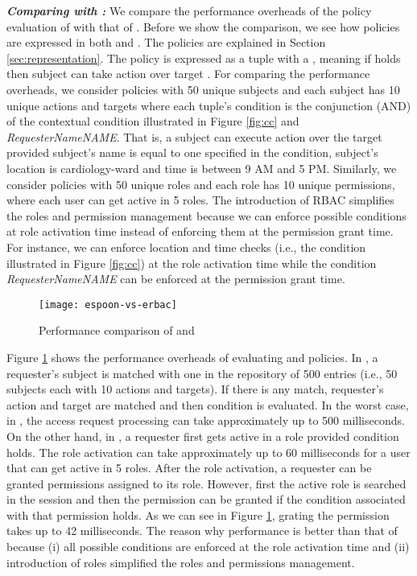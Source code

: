 \documentclass[final,5p,times,twocolumn]{elsarticle}
\begin{document}
\emph{\textbf{Comparing  with :}}
We compare the performance overheads of the policy evaluation of  with that of  \cite{Asghar2011ARES}. Before we show the comparison, we see how policies are expressed in both  and . The  policies are explained in Section \ref{sec:representation}. The  policy is expressed as a  tuple with a , meaning if  holds then subject  can take action  over target . For comparing the performance overheads, we consider  policies with 50 unique subjects and each subject has 10 unique actions and targets where each  tuple's condition is the conjunction (AND) of the contextual condition illustrated in Figure \ref{fig:cc} and \emph{RequesterNameNAME}. That is, a subject can execute action over the target provided subject's name is equal to one specified in the condition, subject's location is cardiology-ward and time is between 9 AM and 5 PM. Similarly, we consider  policies with 50 unique roles and each role has 10 unique permissions, where each user can get active in 5 roles. The introduction of RBAC simplifies the roles and permission management because we can enforce possible conditions at role activation time instead of enforcing them at the permission grant time. For instance, we can enforce location and time checks (i.e., the condition illustrated in Figure \ref{fig:cc}) at the role activation time while the condition \emph{RequesterNameNAME} can be enforced at the permission grant time. 

\begin{figure}
\centering
\texttt{[image: espoon-vs-erbac]} \caption{Performance comparison of  and }
\label{fig:espoon-vs-erbac}
\end{figure}

Figure \ref{fig:espoon-vs-erbac} shows the performance overheads of evaluating  and  policies. In , a requester's subject is matched with one in the repository of 500 entries (i.e., 50 subjects each with 10 actions and targets). If there is any match, requester's action and target are matched and then condition is evaluated. In the worst case, in , the access request processing can take approximately up to 500 milliseconds. On the other hand, in , a requester first gets active in a role provided condition holds. The role activation can take approximately up to 60 milliseconds for a user that can get active in 5 roles. After the role activation, a requester can be granted permissions assigned to its role. However, first the active role is searched in the session and then the permission can be granted if the condition associated with that permission holds. As we can see in Figure \ref{fig:espoon-vs-erbac}, grating the permission takes up to 42 milliseconds. The reason why  performance is better than that of  because (i) all possible conditions are enforced at the role activation time and (ii) introduction of roles simplified the roles and permissions management.
\end{document}
